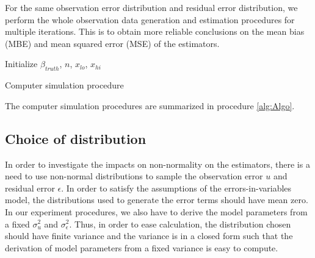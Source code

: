 \documentclass{article}
\begin{document}
For the same observation error distribution and residual error distribution, we perform the whole observation data generation and estimation procedures for multiple iterations.
This is to obtain more reliable conclusions on the mean bias (MBE) and mean squared error (MSE) of the estimators.

\begin{algorithm}[H]
    \SetAlgoLined
    Initialize $\beta_{truth}$, $n$, $x_{lo}$, $x_{hi}$\;
    \caption{Computer simulation procedure}
    \label{alg:Algo}
\end{algorithm}

The computer simulation procedures are summarized in procedure \ref{alg:Algo}. 

\subsection{Choice of distribution}

In order to investigate the impacts on non-normality on the estimators, there is a need to use non-normal distributions to sample the observation error $u$ and residual error $\epsilon$.
In order to satisfy the assumptions of the errors-in-variables model, the distributions used to generate the error terms should have mean zero.
In our experiment procedures, we also have to derive the model parameters from a fixed $\sigma_u^2$ and $\sigma_\epsilon^2$.
Thus, in order to ease calculation, the distribution chosen should have finite variance and the variance is in a closed form such that the derivation of model parameters from a fixed variance is easy to compute.
\end{document}
